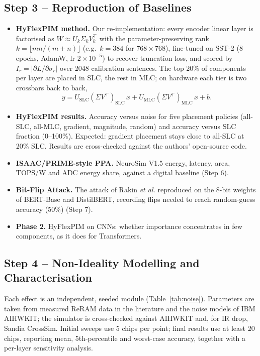 \documentclass[10pt,a4paper]{article}
\begin{document}
\subsection{Step 3 -- Reproduction of Baselines}
\begin{itemize}
\item \textbf{HyFlexPIM method.} Our re-implementation: every encoder linear layer is factorised as
$W\approx U_k\Sigma_k V_k^{\top}$ with the parameter-preserving rank $k=\lfloor mn/(m+n)\rfloor$
(e.g.\ $k=384$ for $768\times768$), fine-tuned on SST-2 (8 epochs, AdamW, lr $2\times10^{-5}$) to
recover truncation loss, and scored by $I_r=|\partial L/\partial\sigma_r|$ over 2048 calibration
sentences. The top 20\% of components per layer are placed in SLC, the rest in MLC; on hardware each
tier is two crossbars back to back, \[y=U_{\mathrm{SLC}}(\Sigma V^{\top})_{\mathrm{SLC}}\,x+U_{\mathrm{MLC}}(\Sigma V^{\top})_{\mathrm{MLC}}\,x+b.\]
\item \textbf{HyFlexPIM results.} Accuracy versus noise for five placement policies (all-SLC, all-MLC,
gradient, magnitude, random) and accuracy versus SLC fraction (0--100\%). Expected: gradient placement
stays close to all-SLC at 20\% SLC. Results are cross-checked against the authors' open-source code.
\item \textbf{ISAAC/PRIME-style PPA.} NeuroSim V1.5 energy, latency, area, TOPS/W and ADC energy share,
against a digital baseline (Step 6).
\item \textbf{Bit-Flip Attack.} The attack of Rakin \emph{et al.} reproduced on the 8-bit weights of
BERT-Base and DistilBERT, recording flips needed to reach random-guess accuracy (50\%) (Step 7).
\item \textbf{Phase 2.} HyFlexPIM on CNNs: whether importance concentrates in few components, as it does
for Transformers.
\end{itemize}

\subsection{Step 4 -- Non-Ideality Modelling and Characterisation}
Each effect is an independent, seeded module (Table~\ref{tab:noise}). Parameters are taken from
measured ReRAM data in the literature and the noise models of IBM AIHWKIT; the simulator is
cross-checked against AIHWKIT and, for IR drop, Sandia CrossSim. Initial sweeps use 5 chips per point;
final results use at least 20 chips, reporting mean, 5th-percentile and worst-case accuracy, together with
a per-layer sensitivity analysis.
\end{document}
